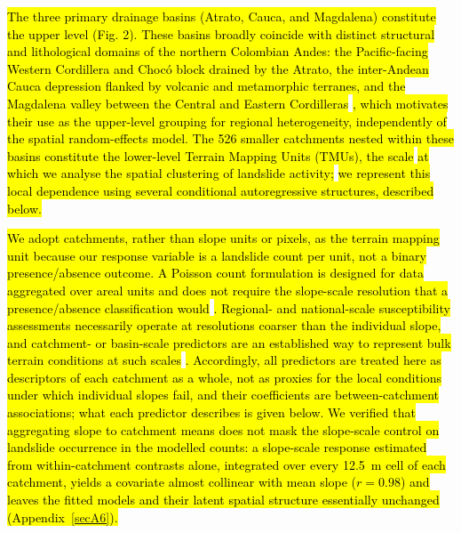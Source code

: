 \documentclass[journal abbreviation, manuscript]{copernicus}
\newcommand{\hlE}[1]{{\sethlcolor{edcyan}\hl{#1}}}
\begin{document}
\hl{The three primary drainage basins (Atrato, Cauca, and Magdalena) constitute the upper level (Fig. 2). 
These basins broadly coincide with distinct structural and lithological domains of the northern Colombian Andes: the Pacific-facing Western Cordillera and Choc\'{o} block drained by the Atrato, the inter-Andean Cauca depression flanked by volcanic and metamorphic terranes, and the Magdalena valley between the Central and Eastern Cordilleras }\citep{Cediel2003, Taboada2000}\hl{, which motivates their use as the upper-level grouping for regional heterogeneity, independently of the spatial random-effects model. 
The 526 smaller catchments nested within these basins constitute the lower-level Terrain Mapping Units (TMUs), the scale} \hlE{at which we analyse the spatial clustering of landslide activity;} \hl{we represent this local dependence using several conditional autoregressive structures, described below.}

\hl{We adopt catchments, rather than slope units or pixels, as the terrain mapping unit because our response variable is a landslide count per unit, not a binary presence/absence outcome. 
A Poisson count formulation is designed for data aggregated over areal units and does not require the slope-scale resolution that a presence/absence classification would }\citep{lombardo2020space}\hl{. 
Regional- and national-scale susceptibility assessments necessarily operate at resolutions coarser than the individual slope, and catchment- or basin-scale predictors are an established way to represent bulk terrain conditions at such scales }\citep{guzzetti2005probabilistic, stanley2017heuristic, nowickijessee2018global}\hlE{. 
Accordingly, all predictors are treated here as descriptors of each catchment as a whole, not as proxies for the local conditions under which individual slopes fail, and their coefficients are between-catchment associations; what each predictor describes is given below. We verified that aggregating slope to catchment means does not mask the slope-scale control on landslide occurrence in the modelled counts: a slope-scale response estimated from within-catchment contrasts alone, integrated over every 12.5~m cell of each catchment, yields a covariate almost collinear with mean slope ($r = 0.98$) and leaves the fitted models and their latent spatial structure essentially unchanged (\mbox{Appendix~\ref{secA6}}).}
\end{document}
